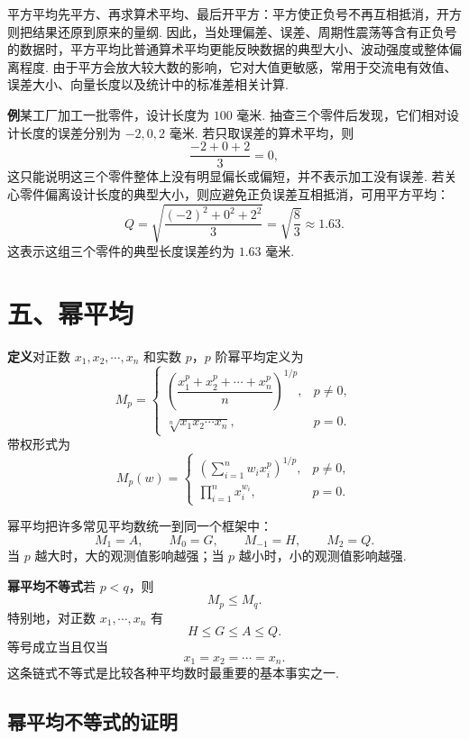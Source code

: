 \documentclass[UTF8, 12pt, fontset=fandol, oneside]{ctexart}
\begin{document}
平方平均先平方、再求算术平均、最后开平方：平方使正负号不再互相抵消，开方则把结果还原到原来的量纲. 因此，当处理偏差、误差、周期性震荡等含有正负号的数据时，平方平均比普通算术平均更能反映数据的典型大小、波动强度或整体偏离程度. 由于平方会放大较大数的影响，它对大值更敏感，常用于交流电有效值、误差大小、向量长度以及统计中的标准差相关计算.

\noindent\textbf{例}\quad 某工厂加工一批零件，设计长度为 $100$ 毫米. 抽查三个零件后发现，它们相对设计长度的误差分别为 $-2,0,2$ 毫米. 若只取误差的算术平均，则
\[
  \frac{-2+0+2}{3}=0,
\]
这只能说明这三个零件整体上没有明显偏长或偏短，并不表示加工没有误差. 若关心零件偏离设计长度的典型大小，则应避免正负误差互相抵消，可用平方平均：
\[
  Q=\sqrt{\frac{(-2)^2+0^2+2^2}{3}}=\sqrt{\frac{8}{3}}\approx1.63.
\]
这表示这组三个零件的典型长度误差约为 $1.63$ 毫米.

\section*{五、幂平均}

\noindent\textbf{定义}\quad 对正数 $x_1,x_2,\cdots,x_n$ 和实数 $p$，$p$ 阶幂平均定义为
\[
  M_p=
  \begin{cases}
    \left(\dfrac{x_1^p+x_2^p+\cdots+x_n^p}{n}\right)^{1/p}, & p\ne0,\\[1.2em]
    \sqrt[n]{x_1x_2\cdots x_n}, & p=0.
  \end{cases}
\]
带权形式为
\[
  M_p(w)=
  \begin{cases}
    \left(\displaystyle\sum_{i=1}^n w_i x_i^p\right)^{1/p}, & p\ne0,\\[1.2em]
    \displaystyle\prod_{i=1}^n x_i^{w_i}, & p=0.
  \end{cases}
\]

幂平均把许多常见平均数统一到同一个框架中：
\[
  M_1=A,\qquad M_0=G,\qquad M_{-1}=H,\qquad M_2=Q.
\]
当 $p$ 越大时，大的观测值影响越强；当 $p$ 越小时，小的观测值影响越强.

\noindent\textbf{幂平均不等式}\quad 若 $p<q$，则
\[
  M_p\le M_q.
\]
特别地，对正数 $x_1,\cdots,x_n$ 有
\[
  H\le G\le A\le Q.
\]
等号成立当且仅当
\[
  x_1=x_2=\cdots=x_n.
\]
这条链式不等式是比较各种平均数时最重要的基本事实之一.

\subsection*{幂平均不等式的证明}

\begingroup
\color{rnorange}
\end{document}
